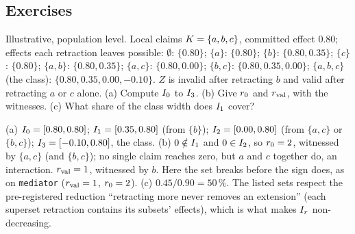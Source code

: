 
\subsection*{Exercises}

\begin{exercicio}[metodo=calculation,conceito=intervalo-conhecimento]
Illustrative, population level. Local claims $K = \{a, b, c\}$, committed effect 0.80; effects
each retraction leaves possible: $\emptyset$: $\{0.80\}$; $\{a\}$: $\{0.80\}$; $\{b\}$: $\{0.80, 0.35\}$; $\{c\}$:
$\{0.80\}$; $\{a,b\}$: $\{0.80, 0.35\}$; $\{a,c\}$: $\{0.80, 0.00\}$; $\{b,c\}$:
$\{0.80, 0.35, 0.00\}$; $\{a,b,c\}$ (the class): $\{0.80, 0.35, 0.00, -0.10\}$. $Z$ is invalid after
retracting $b$ and valid after retracting $a$ or $c$ alone. (a) Compute $I_{0}$ to $I_{3}$. (b)
Give $r_{0}$ and $r_{\mathrm{val}}$, with the witnesses. (c) What share of the class width does $I_{1}$ cover?
\end{exercicio}
\begin{solucao}
(a) $I_{0} = [0.80, 0.80]$; $I_{1} = [0.35, 0.80]$ (from $\{b\}$); $I_{2} = [0.00, 0.80]$ (from
$\{a,c\}$ or $\{b,c\}$); $I_{3} = [-0.10, 0.80]$, the class. (b) $0 \notin I_{1}$ and $0 \in I_{2}$,
so $r_{0} = 2$, witnessed by $\{a,c\}$ (and $\{b,c\}$); no single claim reaches zero, but $a$ and $c$
together do, an interaction. $r_{\mathrm{val}} = 1$, witnessed by $b$. Here the set breaks before the sign does,
as on \texttt{mediator} ($r_{\mathrm{val}} = 1$, $r_{0} = 2$). (c) $0.45 / 0.90 = 50\,\%$. The listed sets respect
the pre-registered reduction ``retracting more never removes an extension'' (each superset retraction
contains its subsets' effects), which is what makes $I_{r}$ non-decreasing.
\end{solucao}

